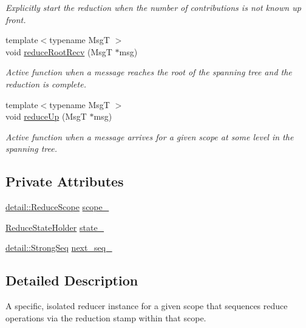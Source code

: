 \begin{DoxyCompactItemize}
\begin{DoxyCompactList}\small\item\em Explicitly start the reduction when the number of contributions is not known up front. \end{DoxyCompactList}\item 
{\footnotesize template$<$typename MsgT $>$ }\\void \hyperlink{structvt_1_1collective_1_1reduce_1_1_reduce_a48c7bb604fade1b64b9b391f4091ad5b}{reduce\+Root\+Recv} (MsgT $\ast$msg)
\begin{DoxyCompactList}\small\item\em Active function when a message reaches the root of the spanning tree and the reduction is complete. \end{DoxyCompactList}\item 
{\footnotesize template$<$typename MsgT $>$ }\\void \hyperlink{structvt_1_1collective_1_1reduce_1_1_reduce_a2bae42586b143c42c731bcd9c96d4426}{reduce\+Up} (MsgT $\ast$msg)
\begin{DoxyCompactList}\small\item\em Active function when a message arrives for a given scope at some level in the spanning tree. \end{DoxyCompactList}\end{DoxyCompactItemize}
\subsection*{Private Attributes}
\begin{DoxyCompactItemize}
\item 
\hyperlink{structvt_1_1collective_1_1reduce_1_1detail_1_1_reduce_scope}{detail\+::\+Reduce\+Scope} \hyperlink{structvt_1_1collective_1_1reduce_1_1_reduce_a70ebc22c7420905f3e178dccb126c435}{scope\+\_\+}
\item 
\hyperlink{structvt_1_1collective_1_1reduce_1_1_reduce_state_holder}{Reduce\+State\+Holder} \hyperlink{structvt_1_1collective_1_1reduce_1_1_reduce_a49b9fcaf2f8b76d350d1e3b809add2aa}{state\+\_\+}
\item 
\hyperlink{namespacevt_1_1collective_1_1reduce_1_1detail_affec2854d7d65bafb17eb259714e9443}{detail\+::\+Strong\+Seq} \hyperlink{structvt_1_1collective_1_1reduce_1_1_reduce_a368873db0ddebf8365fdd3021927a691}{next\+\_\+seq\+\_\+}
\end{DoxyCompactItemize}


\subsection{Detailed Description}
A specific, isolated reducer instance for a given scope that sequences reduce operations via the reduction stamp within that scope. 


